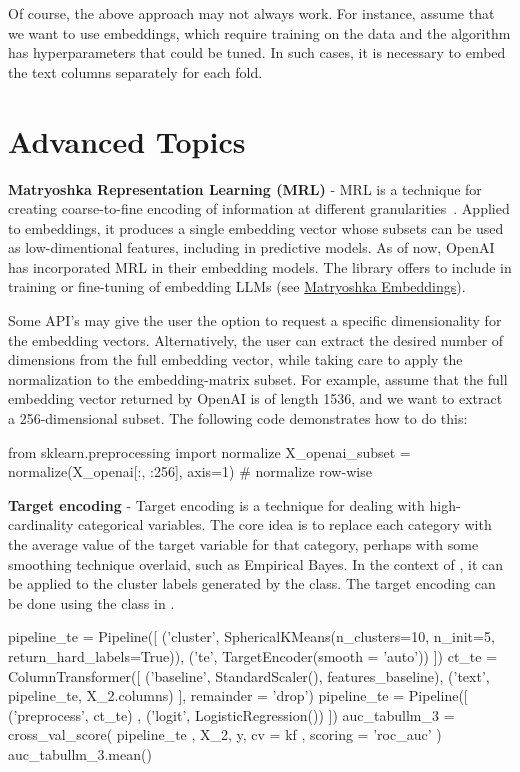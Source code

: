 \documentclass[article]{jss}
\begin{document}
Of course, the above approach may not always work. For instance, assume that we want to use  embeddings, which require training on the data and the algorithm has hyperparameters that could be tuned. In such cases, it is necessary to embed the text columns separately for each fold.

\section{Advanced Topics} \label{sec:advanced-topics}

\textbf{Matryoshka Representation Learning (MRL)} - MRL is a technique for creating coarse-to-fine encoding of information at different granularities~\citep{kusupati2022matryoshka}. Applied to embeddings, it produces a single embedding vector whose subsets can be used as low-dimentional features, including in predictive models. As of now, OpenAI has incorporated MRL in their embedding models. The  library offers  to include in training or fine-tuning of embedding LLMs (see \href{https://sbert.net/examples/training/matryoshka/README.html}{Matryoshka Embeddings}).

Some API's may give the user the option to request a specific dimensionality for the embedding vectors. Alternatively, the user can extract the desired number of dimensions from the full embedding vector, while taking care to apply the normalization to the embedding-matrix subset. For example, assume that the full embedding vector returned by OpenAI is of length 1536, and we want to extract a 256-dimensional subset. The following code demonstrates how to do this:
\begin{pyverbatim}
from sklearn.preprocessing import normalize
X_openai_subset = normalize(X_openai[:, :256], axis=1) # normalize row-wise
\end{pyverbatim}

\textbf{Target encoding} - Target encoding is a technique for dealing with high-cardinality categorical variables. The core idea is to replace each category with the average value of the target variable for that category, perhaps with some smoothing technique overlaid, such as Empirical Bayes. In the context of , it can be applied to the cluster labels generated by the  class. The target encoding can be done using the  class in .

\begin{pyverbatim}
pipeline_te = Pipeline([
    ('cluster', SphericalKMeans(n_clusters=10, n_init=5, return_hard_labels=True)),
    ('te', TargetEncoder(smooth = 'auto'))
])
ct_te = ColumnTransformer([
    ('baseline', StandardScaler(), features_baseline),
    ('text', pipeline_te, X_2.columns)
], remainder = 'drop')
pipeline_te = Pipeline([
    ('preprocess', ct_te)
    , ('logit', LogisticRegression())
])
auc_tabullm_3 = cross_val_score(
    pipeline_te
    , X_2, y, cv = kf
    , scoring = 'roc_auc'
)
auc_tabullm_3.mean()
\end{pyverbatim}
\end{document}
